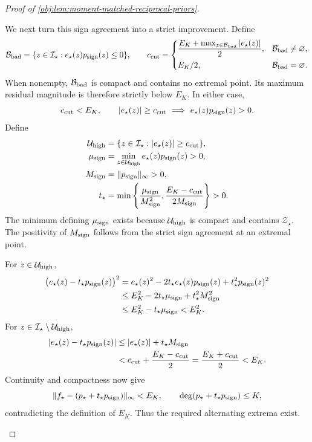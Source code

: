 \documentclass[11pt]{article}
\begin{document}
\begin{proof}[Proof of \cref{obj:lem:moment-matched-reciprocal-priors}]
\begin{enumerate}
We next turn this sign agreement into a strict improvement. Define
\[
\mathcal B_{\rm bad}
=\{z\in\mathcal I_\star:e_\star(z)p_{\rm sign}(z)\le0\},
\qquad
c_{\rm cut}
=
\begin{cases}
\displaystyle
\frac{E_K+\max_{z\in\mathcal B_{\rm bad}}|e_\star(z)|}{2},
&\mathcal B_{\rm bad}\ne\varnothing,\\[6pt]
E_K/2,&\mathcal B_{\rm bad}=\varnothing.
\end{cases}
\]
When nonempty, \(\mathcal B_{\rm bad}\) is compact and contains no extremal point. Its maximum residual magnitude is therefore strictly below \(E_K\). In either case,
\[
c_{\rm cut}<E_K,\qquad
|e_\star(z)|\ge c_{\rm cut}
\ \Longrightarrow\
e_\star(z)p_{\rm sign}(z)>0.
\]
Define
\[
\begin{aligned}
\mathcal U_{\rm high}
&=\{z\in\mathcal I_\star:|e_\star(z)|\ge c_{\rm cut}\},\\
\mu_{\rm sign}
&=\min_{z\in\mathcal U_{\rm high}}
  e_\star(z)p_{\rm sign}(z)>0,\\
M_{\rm sign}
&=\|p_{\rm sign}\|_\infty>0,\\
t_\star
&=\min\left\{
\frac{\mu_{\rm sign}}{M_{\rm sign}^2},
\frac{E_K-c_{\rm cut}}{2M_{\rm sign}}
\right\}>0.
\end{aligned}
\]
The minimum defining \(\mu_{\rm sign}\) exists because \(\mathcal U_{\rm high}\) is compact and contains \(\mathcal Z_\star\). The positivity of \(M_{\rm sign}\) follows from the strict sign agreement at an extremal point.

For \(z\in\mathcal U_{\rm high}\),
\[
\begin{aligned}
\bigl(e_\star(z)-t_\star p_{\rm sign}(z)\bigr)^2
&=e_\star(z)^2
 -2t_\star e_\star(z)p_{\rm sign}(z)
 +t_\star^2p_{\rm sign}(z)^2\\
&\le E_K^2-2t_\star\mu_{\rm sign}
       +t_\star^2M_{\rm sign}^2\\
&\le E_K^2-t_\star\mu_{\rm sign}
<E_K^2.
\end{aligned}
\]
For \(z\in\mathcal I_\star\setminus\mathcal U_{\rm high}\),
\[
\begin{aligned}
|e_\star(z)-t_\star p_{\rm sign}(z)|
&\le |e_\star(z)|+t_\star M_{\rm sign}\\
&<c_{\rm cut}+\frac{E_K-c_{\rm cut}}2
=\frac{E_K+c_{\rm cut}}2<E_K.
\end{aligned}
\]
Continuity and compactness now give
\[
\|f_\star-(p_\star+t_\star p_{\rm sign})\|_\infty<E_K,
\qquad
\deg(p_\star+t_\star p_{\rm sign})\le K,
\]
contradicting the definition of \(E_K\). Thus the required alternating extrema exist.


\end{enumerate}
\end{proof}
\end{document}
